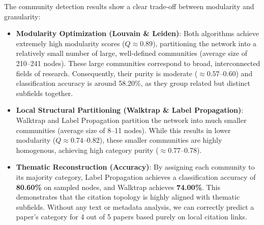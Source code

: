 \documentclass[11pt,a4paper]{article}
\begin{document}
\begin{table}[H]
\centering
\caption{Comparison of community detection algorithms on the largest connected component of the filtered network.}
\label{tab:community_detection}
\end{table}

The community detection results show a clear trade-off between modularity and granularity:
\begin{itemize}
    \item \textbf{Modularity Optimization (Louvain \& Leiden)}: Both algorithms achieve extremely high modularity scores ($Q \approx 0.89$), partitioning the network into a relatively small number of large, well-defined communities (average size of 210--241 nodes). These large communities correspond to broad, interconnected fields of research. Consequently, their purity is moderate ($\approx 0.57$--0.60) and classification accuracy is around 58.20\%, as they group related but distinct subfields together.
    \item \textbf{Local Structural Partitioning (Walktrap \& Label Propagation)}: Walktrap and Label Propagation partition the network into much smaller communities (average size of 8--11 nodes). While this results in lower modularity ($Q \approx 0.74$--0.82), these smaller communities are highly homogenous, achieving high category purity ($\approx 0.77$--0.78).
    \item \textbf{Thematic Reconstruction (Accuracy)}: By assigning each community to its majority category, Label Propagation achieves a classification accuracy of \textbf{80.60\%} on sampled nodes, and Walktrap achieves \textbf{74.00\%}. This demonstrates that the citation topology is highly aligned with thematic subfields. Without any text or metadata analysis, we can correctly predict a paper's category for 4 out of 5 papers based purely on local citation links.
\end{itemize}
\end{document}
